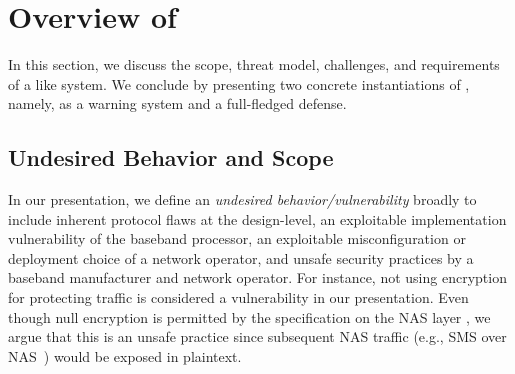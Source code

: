 \section{Overview of \systemtitle}
In this section, we discuss the scope, threat model, challenges, and requirements of
a \system like system. We conclude by presenting two concrete instantiations of \system, namely,
as a warning system and a full-fledged defense.

\subsection{Undesired Behavior and Scope}

In our presentation, we define an
\emph{undesired behavior/vulnerability}
broadly to include
inherent protocol flaws at the design-level,
an exploitable implementation vulnerability
of the baseband processor, an exploitable misconfiguration or
deployment choice of a network operator, and unsafe security
practices by a baseband manufacturer and network operator.
For instance, not using encryption for protecting traffic
is considered a vulnerability in our presentation. Even though null encryption
is permitted by the specification on the NAS layer \cite{3gppNAS},
we argue that this is an unsafe practice since subsequent NAS traffic (e.g., SMS over NAS~\cite{kim_ltefuzz_sp19, lteinspector})
would be exposed in plaintext. %

